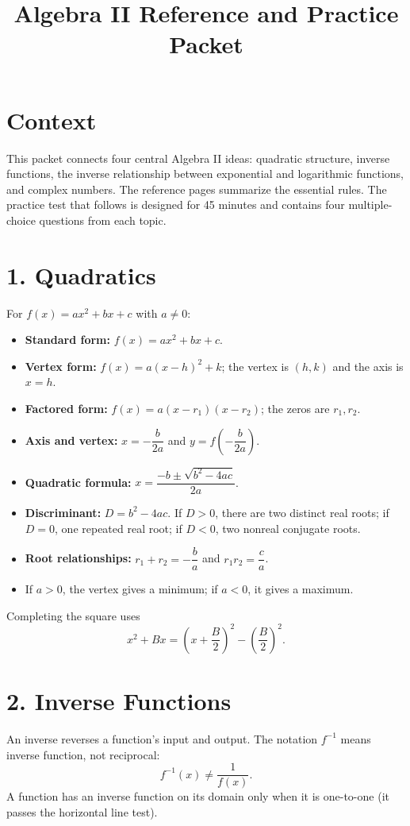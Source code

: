 \documentclass[12pt]{article}
\title{Algebra II Reference and Practice Packet}
\author{}
\date{}
\begin{document}
\maketitle

\section*{Context}
This packet connects four central Algebra II ideas: quadratic structure, inverse functions, the inverse relationship between exponential and logarithmic functions, and complex numbers. The reference pages summarize the essential rules. The practice test that follows is designed for 45 minutes and contains four multiple-choice questions from each topic.

\section*{1. Quadratics}
For $f(x)=ax^2+bx+c$ with $a\ne0$:
\begin{itemize}[leftmargin=1.5em,itemsep=0.25em]
  \item \textbf{Standard form:} $f(x)=ax^2+bx+c$.
  \item \textbf{Vertex form:} $f(x)=a(x-h)^2+k$; the vertex is $(h,k)$ and the axis is $x=h$.
  \item \textbf{Factored form:} $f(x)=a(x-r_1)(x-r_2)$; the zeros are $r_1,r_2$.
  \item \textbf{Axis and vertex:} $x=-\dfrac{b}{2a}$ and $y=f\!\left(-\dfrac{b}{2a}\right)$.
  \item \textbf{Quadratic formula:} $x=\dfrac{-b\pm\sqrt{b^2-4ac}}{2a}$.
  \item \textbf{Discriminant:} $D=b^2-4ac$. If $D>0$, there are two distinct real roots; if $D=0$, one repeated real root; if $D<0$, two nonreal conjugate roots.
  \item \textbf{Root relationships:} $r_1+r_2=-\dfrac ba$ and $r_1r_2=\dfrac ca$.
  \item If $a>0$, the vertex gives a minimum; if $a<0$, it gives a maximum.
\end{itemize}
Completing the square uses
\[
  x^2+Bx=\left(x+\frac B2\right)^2-\left(\frac B2\right)^2.
\]

\section*{2. Inverse Functions}
An inverse reverses a function's input and output. The notation $f^{-1}$ means inverse function, not reciprocal:
\[
  f^{-1}(x)\ne \frac1{f(x)}.
\]
A function has an inverse function on its domain only when it is one-to-one (it passes the horizontal line test).
\end{document}
